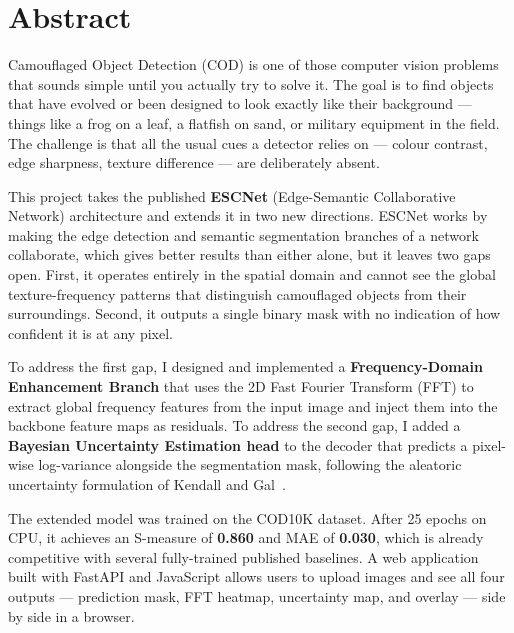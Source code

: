 \documentclass[12pt,a4paper]{report}
\begin{document}
\chapter*{Abstract}

Camouflaged Object Detection (COD) is one of those computer vision problems that sounds simple until you actually try to solve it. The goal is to find objects that have evolved or been designed to look exactly like their background — things like a frog on a leaf, a flatfish on sand, or military equipment in the field. The challenge is that all the usual cues a detector relies on — colour contrast, edge sharpness, texture difference — are deliberately absent.

This project takes the published \textbf{ESCNet} (Edge-Semantic Collaborative Network) architecture and extends it in two new directions. ESCNet works by making the edge detection and semantic segmentation branches of a network collaborate, which gives better results than either alone, but it leaves two gaps open. First, it operates entirely in the spatial domain and cannot see the global texture-frequency patterns that distinguish camouflaged objects from their surroundings. Second, it outputs a single binary mask with no indication of how confident it is at any pixel.

To address the first gap, I designed and implemented a \textbf{Frequency-Domain Enhancement Branch} that uses the 2D Fast Fourier Transform (FFT) to extract global frequency features from the input image and inject them into the backbone feature maps as residuals. To address the second gap, I added a \textbf{Bayesian Uncertainty Estimation head} to the decoder that predicts a pixel-wise log-variance alongside the segmentation mask, following the aleatoric uncertainty formulation of Kendall and Gal~\cite{kendall2017uncertainties}.

The extended model was trained on the COD10K dataset. After 25 epochs on CPU, it achieves an S-measure of \textbf{0.860} and MAE of \textbf{0.030}, which is already competitive with several fully-trained published baselines. A web application built with FastAPI and JavaScript allows users to upload images and see all four outputs — prediction mask, FFT heatmap, uncertainty map, and overlay — side by side in a browser.

\clearpage

\end{document}

